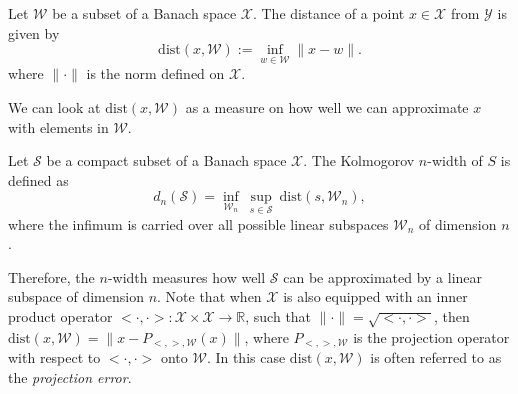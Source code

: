 \begin{definition} \label{def:3.1}
Let $\mathcal W$ be a subset of a Banach space $\mathcal X$. The distance of a point $x\in \mathcal X$ from $\mathcal Y$ is given by
\begin{equation}  \label{eq:3.3}
	\text{dist}(x,\mathcal W) := \inf_{w\in \mathcal W} \| x-w \|.
\end{equation}
where $\|\cdot\|$ is the norm defined on $\mathcal X$.
\end{definition}
We can look at $\text{dist}(x,\mathcal W)$ as a measure on how well we can approximate $x$ with elements in $\mathcal W$.
\begin{definition} \label{def:3.2}
Let $\mathcal S$ be a compact subset of a Banach space $\mathcal X$. The Kolmogorov $n$-width of $S$ is defined as
\begin{equation} \label{eq:3.4}
	d_n(\mathcal S) = \inf_{\mathcal W_n} \ \sup_{s\in \mathcal S} \ \text{dist}(s, \mathcal W_n),
\end{equation}
where the infimum is carried over all possible linear subspaces $\mathcal W_n$ of dimension $n$.
\end{definition}
Therefore, the $n$-width measures how well $\mathcal S$ can be approximated by a linear subspace of dimension $n$. Note that when $\mathcal X$ is also equipped with an inner product operator $<\cdot , \cdot> :\mathcal X \times \mathcal X \to \mathbb R $, such that $\| \cdot \| = \sqrt{<\cdot , \cdot>}$, then $\text{dist}(x,\mathcal W) = \| x - P_{<,>,\mathcal W}(x) \|$, where $P_{<,>,\mathcal W}$ is the projection operator with respect to $<\cdot,\cdot>$ onto $\mathcal W$. In this case $\text{dist}(x,\mathcal W)$ is often referred to as the \emph{projection error}.

